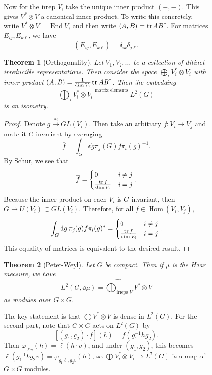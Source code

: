 \documentclass[leqno, openany]{memoir}
\newtheorem{thm}{Theorem}[section]
\theoremstyle{definition}
\theoremstyle{remark}
\theoremstyle{plain}
\theoremstyle{definition}
\theoremstyle{remark}
\newcommand{\ol}[1]{\overline{#1}}
\newcommand{\wh}[1]{\widehat{#1}}
\DeclareMathOperator{\Hom}{Hom}
\DeclareMathOperator{\End}{End}
\begin{document}
\begin{figure}[H]
Now for the irrep $V$, take the unique inner product $(-,-)$. This gives $V^*
\otimes V$ a canonical inner product. To write this concretely, write $V^*
\otimes V = \End V$, and then write $(A,B) = \tr AB^{\dag}$. For matrices
$E_{ij}, E_{k\ell}$, we have \[ (E_{ij}, E_{k\ell}) = \delta_{ik}
\delta_{j\ell}. \]

\begin{thm}[Orthogonality] Let $V_1, V_2, \ldots$ be a collection of ditinct
    irreducible representations. Then consider the space $\bigoplus_i V_i^*
    \otimes V_i$ with inner product $(A,B) = \frac{1}{\dim V_i} \tr AB^{\dag}$.
    Then the embedding \[ \bigoplus_i V_i^* \otimes V_i
    \xrightarrow{\text{matrix elements}} L^2(G) \] is an isometry.  \end{thm}

\begin{proof} Denote $g \xrightarrow{\pi_i} GL(V_i)$. Then take an arbitrary $f
    \colon V_i \to V_j$ and make it $G$-invariant by averaging \[ \ol{f} =
        \int_G \dd{g} \pi_j(G) f \pi_i{ (g) }^{-1}. \] By Schur, we see that \[
        \ol{f} = \begin{cases} 0 & i \neq j \\ \frac{\tr f}{\dim V_i} & i = j
            \end{cases}. \] Because the inner product on each $V_i$ is
            $G$-invariant, then $G \to U(V_i) \subset GL(V_i)$. Therefore, for
            all $f \in \Hom(V_i, V_j)$, \[ \int_G \dd{g} \pi_j(g) f \pi_i(g)^*
                = \begin{cases} 0 & i \neq j \\ \frac{\tr f}{\dim V_i} & i = j
                \end{cases}. \] This equality of matrices is equivalent to the
            desired result.  \end{proof}

\begin{thm}[Peter-Weyl] Let $G$ be compact. Then if $\mu$ is the Haar measure,
    we have \[ L^2(G, \dd{\mu}) = \wh{\bigoplus_{{\text{irreps } V}}} V^*
    \otimes V \] as modules over $G \times G$.  \end{thm}

The key statement is that $\bigoplus V^* \otimes V$ is dense in $L^2(G)$. For
the second part, note that $G \times G$ acts on $L^2(G)$ by \[ [(g_1, g_2)
\cdot f](h) = f(g_1^{-1} h g_2). \] Then $\varphi_{\ell v}(h) = \ell(h \cdot
v)$, and under $(g_1, g_2)$, this becomes $\ell(g_1^{-1}h g_2 v) = \varphi_{g_1
\ell, g_2 v}(h)$, so $\bigoplus V_i^* \otimes V_i \to L^2(G)$ is a map of $G
\times G$ modules. 


\end{figure}
\end{document}
